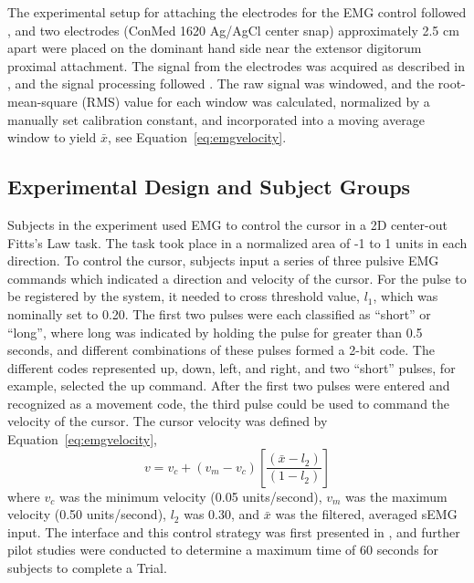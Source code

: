 The experimental setup for attaching the electrodes for the EMG control followed \citeauthor{RN44}, and two electrodes (ConMed 1620 Ag/AgCl center snap) approximately 2.5 cm apart were placed on the dominant hand side near the extensor digitorum proximal attachment.
The signal from the electrodes was acquired as described in \citet{RN44}, and the signal processing followed \citet{RN45}.
The raw signal was windowed, and the root-mean-square (RMS) value for each window was calculated, normalized by a manually set calibration constant, and incorporated into a moving average window to yield $\bar{x}$, see Equation~\ref{eq:emgvelocity}.

\subsection{Experimental Design and Subject Groups}

Subjects in the experiment used EMG to control the cursor in a 2D center-out Fitts's Law task.
The task took place in a normalized area of -1 to 1 units in each direction.
To control the cursor, subjects input a series of three pulsive EMG commands which indicated a direction and velocity of the cursor.
For the pulse to be registered by the system, it needed to cross threshold value, $l_1$, which was nominally set to 0.20.
The first two pulses were each classified as ``short'' or ``long'', where long was indicated by holding the pulse for greater than 0.5 seconds, and different combinations of these pulses formed a 2-bit code.
The different codes represented up, down, left, and right, and two ``short'' pulses, for example, selected the up command.
After the first two pulses were entered and recognized as a movement code, the third pulse could be used to command the velocity of the cursor.
The cursor velocity was defined by Equation~\ref{eq:emgvelocity},
\begin{equation}
	\label{eq:emgvelocity}
	v= v_c+\left(v_m-v_c\right)\left[\frac{\left(\bar{x}-l_2\right)}{\left(1-l_2\right)}\right]
\end{equation}
where $v_c$ was the minimum velocity (0.05 units/second), $v_m$ was the maximum velocity (0.50 units/second), $l_2$ was 0.30, and $\bar{x}$ was the filtered, averaged sEMG input.
The interface and this control strategy was first presented in \citet{RN45}, and further pilot studies were conducted to determine a maximum time of 60 seconds for subjects to complete a Trial.

